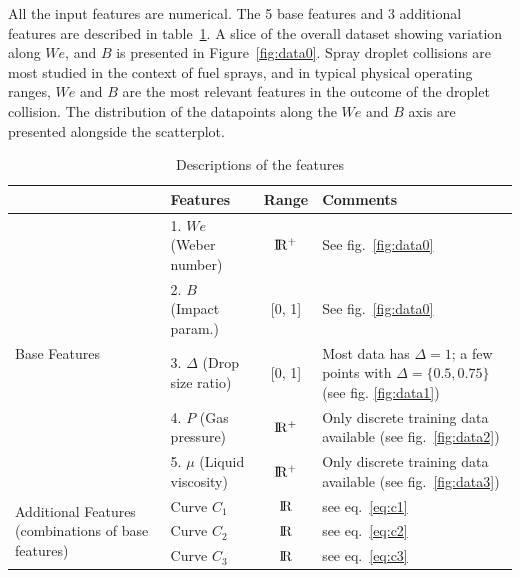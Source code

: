 \documentclass{article}
\begin{document}
All the input features are numerical. The 5 base features and 3 additional features are described in table~\ref{tab:features}. A slice of the overall dataset showing variation along $We$, and $B$ is presented in Figure~\ref{fig:data0}. Spray droplet collisions are most studied in the context of fuel sprays, and in typical physical operating ranges, $We$ and $B$ are the most relevant features in the outcome of the droplet collision. The distribution of the datapoints along the $We$ and $B$ axis are presented alongside the scatterplot.

\begin{table}[h]
  \caption{Descriptions of the features}
  \label{tab:features}
  \centering
  \begin{tabular}{l l c p{5cm}}
    \toprule
    & 							Features		  			& Range & Comments\\
    \midrule
   \multirow{ 5}{*}{Base Features} 	& 1. $We$ (Weber number)      	& $\rm I\!R^+$ 	& See fig.~\ref{fig:data0}  \\
     							& 2. $B$ (Impact param.)		& [0, 1]  			& See fig.~\ref{fig:data0} \\
    							& 3. $\Delta$ (Drop size ratio)  	& [0, 1]  			& Most data has $\Delta = 1$; a few points with $\Delta = \{0.5, 0.75\}$ (see fig. \ref{fig:data1})   \\
    							& 4. $P$ (Gas pressure) 		& $\rm I\!R^+$	&  Only discrete training data available (see fig.~\ref{fig:data2})\\
    							& 5. $\mu$ (Liquid viscosity) 		& $\rm I\!R^+$ 	& Only discrete training data available (see fig.~\ref{fig:data3}) \\
   \midrule
   \multirow{ 3}{3cm}{Additional Features (combinations of base features)} 	& Curve $C_1$     			& $\rm I\!R$ &  see eq.~\ref{eq:c1}\\
     							& Curve $C_2$					& $\rm I\!R$  & see eq.~\ref{eq:c2} \\
    							& Curve $C_3$  					& $\rm I\!R$  & see eq.~\ref{eq:c3}\\
    \bottomrule
  \end{tabular}
\end{table}
\end{document}
